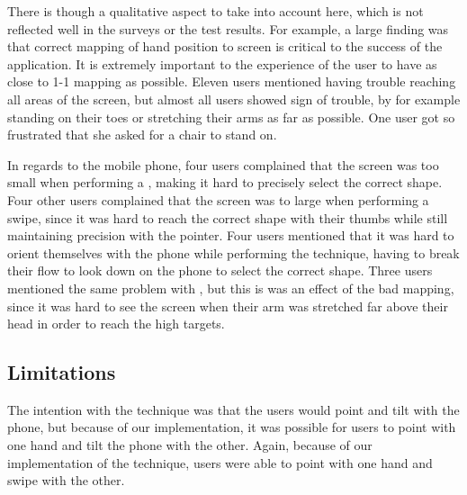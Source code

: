 There is though a qualitative aspect to take into account here, which is not reflected well in the surveys or the test results. For example, a large finding was that correct mapping of hand position to screen is critical to the success of the application.
It is extremely important to the experience of the user to have as close to 1-1 mapping as possible. 
Eleven users mentioned having trouble reaching all areas of the screen, but almost all users showed sign of trouble, by for example standing on their toes or stretching their arms as far as possible.
One user got so frustrated that she asked for a chair to stand on. 

In regards to the mobile phone, four users complained that the screen was too small when performing a \pinch, making it hard to precisely select the correct shape.
Four other users complained that the screen was to large when performing a swipe, since it was hard to reach the correct shape with their thumbs while still maintaining precision with the pointer. 
Four users mentioned that it was hard to orient themselves with the phone while performing the \throw technique, having to break their flow to look down on the phone to select the correct shape. 
Three users mentioned the same problem with \swipe, but this is was an effect of the bad mapping, since it was hard to see the screen when their arm was stretched far above their head in order to reach the high targets. 





\subsection{Limitations}

The intention with the \tilt technique was that the users would point and tilt with the phone, but because of our implementation, it was possible for users to point with one hand and tilt the phone with the other.
Again, because of our implementation of the \swipe technique, users were able to point with one hand and swipe with the other.